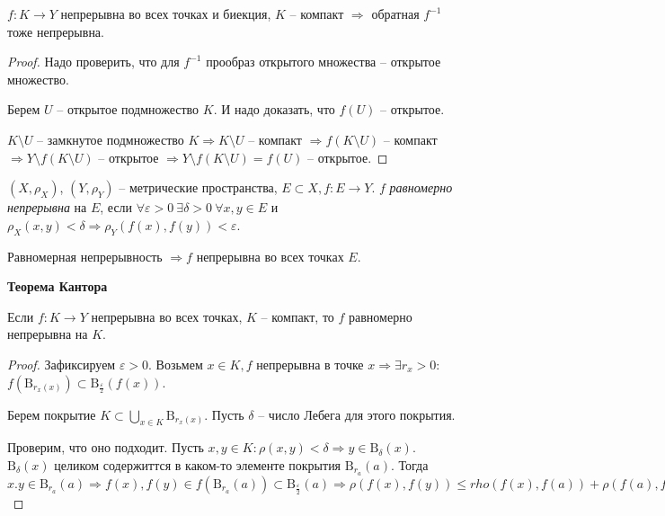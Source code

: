 \begin{theorem}
    $f:K\rightarrow Y$ непрерывна во всех точках и биекция, $K$ – компакт $\Rightarrow$ обратная $f^{-1}$ тоже непрерывна.
\end{theorem}

\begin{proof}
    Надо проверить, что для $f^{-1}$ прообраз открытого множества – открытое множество.

    Берем $U$ – открытое подмножество $K$. И надо доказать, что $f(U)$ –  открытое.

    $K\setminus U$ – замкнутое подмножество $K\Rightarrow K\setminus U$ – компакт $\Rightarrow f(K\setminus U)$ – компакт $\Rightarrow Y\setminus f(K\setminus U)$ – открытое $\Rightarrow Y\setminus f(K\setminus U)=f(U)$ – открытое.
\end{proof}

\begin{definition}
    $(X, \rho_X)$, $(Y,  \rho_Y)$ – метрические пространства, $E\subset X, f:E\rightarrow Y$. $f$  \textit{равномерно непрерывна} на $E$, если $\forall \varepsilon > 0\ \exists \delta > 0 \ \forall x, y\in E$ и $\rho_X(x, y)<\delta \Rightarrow \rho_Y(f(x), f(y))<\varepsilon$.    
\end{definition}

\begin{remark}
    Равномерная непрерывность $\Rightarrow f$ непрерывна во всех точках $E$. 
\end{remark}

\begin{theorem}
    \textbf{Теорема Кантора}

    Если $f:K\rightarrow Y$ непрерывна во всех точках, $K$ – компакт, то $f$ равномерно непрерывна на $K$.
\end{theorem}

\begin{proof}
    Зафиксируем $\varepsilon>0$. Возьмем $x\in K, f$ непрерывна в точке $x\Rightarrow \exists r_x>0:$ $f(\text{B}_{r_x(x)})\subset \text{B}_{\frac{\varepsilon}{2}}(f(x))$.

    Берем покрытие $K \subset \bigcup\limits_{x\in K} \text{B}_{r_x(x)}$. Пусть $\delta$ – число Лебега для этого покрытия. 
    
    Проверим, что оно подходит. Пусть $x, y\in K:\rho(x, y)<\delta\Rightarrow y\in \text{B}_\delta(x)$. $\text{B}_\delta(x)$ целиком содержиттся в каком-то элементе покрытия $\text{B}_{r_a}(a)$. Тогда $x.y\in \text{B}_{r_a}(a)\Rightarrow f(x), f(y)\in f(\text{B}_{r_a}(a))\subset\text{B}_{\frac{\varepsilon}{2}}(a)\Rightarrow \rho( f(x), f(y)) \leq rho(f(x), f(a)) + \rho(f(a), f(y))<\frac{\varepsilon}{2}+\frac{\varepsilon}{2} =\varepsilon$
\end{proof}